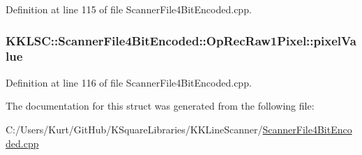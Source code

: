 Definition at line 115 of file Scanner\+File4\+Bit\+Encoded.\+cpp.

\subsubsection[{\texorpdfstring{pixel\+Value}{pixelValue}}]{ K\+K\+L\+S\+C\+::\+Scanner\+File4\+Bit\+Encoded\+::\+Op\+Rec\+Raw1\+Pixel\+::pixel\+Value}\hypertarget{struct_scanner_file4_bit_encoded_1_1_op_rec_raw1_pixel_ae2dd94da5c3bed1079f807525d1fc8cc}{}\label{struct_scanner_file4_bit_encoded_1_1_op_rec_raw1_pixel_ae2dd94da5c3bed1079f807525d1fc8cc}


Definition at line 116 of file Scanner\+File4\+Bit\+Encoded.\+cpp.



The documentation for this struct was generated from the following file\+:\begin{DoxyCompactItemize}
\item 
C\+:/\+Users/\+Kurt/\+Git\+Hub/\+K\+Square\+Libraries/\+K\+K\+Line\+Scanner/\hyperlink{_scanner_file4_bit_encoded_8cpp}{Scanner\+File4\+Bit\+Encoded.\+cpp}\end{DoxyCompactItemize}
